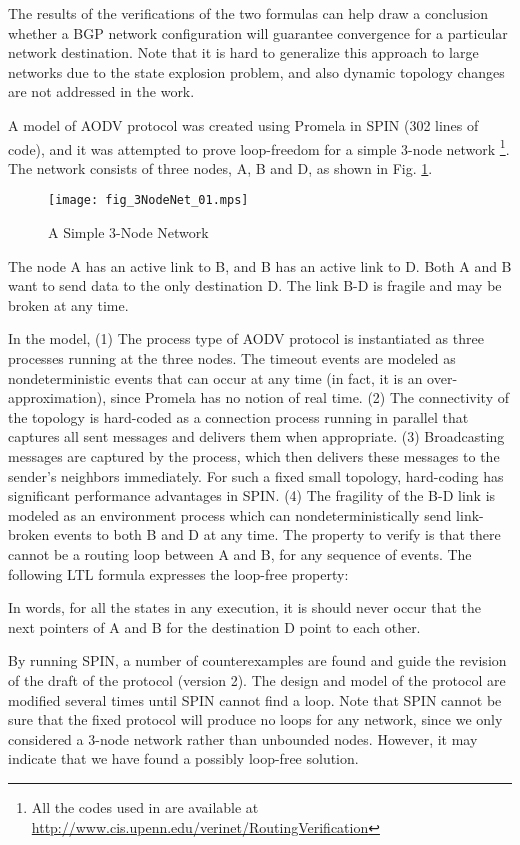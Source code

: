 \documentclass[a4paper,10pt,twocolumn]{article}
\begin{document}
The results of the verifications of the two formulas can help draw a conclusion whether a BGP network configuration will guarantee convergence for a particular network destination. Note that it is hard to generalize this approach to large networks due to the state explosion problem, and also dynamic topology changes are not addressed in the work.

A model of AODV protocol was created using Promela in SPIN (302 lines of code), and it was attempted to prove loop-freedom for a simple 3-node network \cite{BOG02}\footnote{All the codes used in \cite{BOG02} are available at \url{http://www.cis.upenn.edu/verinet/RoutingVerification}}. The network consists of three nodes, A, B and D, as shown in Fig. \ref{Fig:3NodeNet}.
\begin{figure}
  \centering
  \texttt{[image: fig\_3NodeNet\_01.mps]}\\
  \caption{A Simple 3-Node Network}\label{Fig:3NodeNet}
\end{figure}
The node A has an active link to B, and B has an active link to D. Both A and B want to send data to the only destination D. The link B-D is fragile and may be broken at any time.

In the model, (1) The process type of AODV protocol is instantiated as three processes running at the three nodes. The timeout events are modeled as nondeterministic events that can occur at any time (in fact, it is an over-approximation), since Promela has no notion of real time. (2) The connectivity of the topology is hard-coded as a connection process running in parallel that captures all sent messages and delivers them when appropriate. (3) Broadcasting messages are captured by the process, which then delivers these messages to the sender's neighbors immediately. For such a fixed small topology, hard-coding has significant performance advantages in SPIN. (4) The fragility of the B-D link is modeled as an environment process which can nondeterministically send link-broken events to both B and D at any time. The property to verify is that there cannot be a routing loop between A and B, for any sequence of events. The following LTL formula expresses the loop-free property:

In words, for all the states in any execution, it is should never occur that the next pointers of A and B for the destination D point to each other.

By running SPIN, a number of counterexamples are found and guide the revision of the draft of the protocol (version 2). The design and model of the protocol are modified several times until SPIN cannot find a loop. Note that SPIN cannot be sure that the fixed protocol will produce no loops for any network, since we only considered a 3-node network rather than unbounded nodes. However, it may indicate that we have found a possibly loop-free solution.
\end{document}
